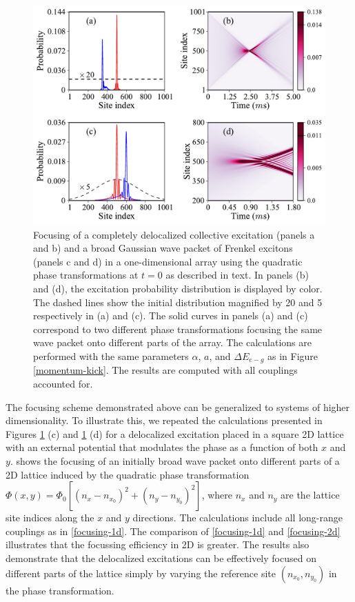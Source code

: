 \begin{figure}[htbp]
\centering
\includegraphics[width=\linewidth]{focusing-1d.pdf}
\caption{ Focusing of a completely delocalized collective
excitation (panels a and b) and a broad Gaussian wave packet of
Frenkel excitons (panels c and d) in a one-dimensional array using the quadratic phase
transformations at $t=0$ as described in text. In panels (b) and (d),
the excitation probability distribution is displayed by color.
The dashed lines
show the initial distribution magnified by 20 and 5 respectively
in (a) and (c). The solid curves in panels (a) and (c) correspond
to two different phase transformations focusing the same wave
packet onto different parts of the array.  The calculations are
performed with the same parameters $\alpha$, $a$, and $\Delta
E_{e-g}$ as in Figure \ref{momentum-kick}. The results are computed
with all couplings accounted for. }\label{focusing-1d}
\end{figure}

The focusing scheme demonstrated above can be generalized to  systems of higher
dimensionality. To illustrate this, we repeated the calculations
presented in Figures \ref{focusing-1d} (c) and \ref{focusing-1d} (d) for
a delocalized excitation placed in a square 2D lattice with an external
potential that modulates the phase as a function of both $x$ and
$y$.  shows the focusing of an initially broad wave packet
onto different parts of a 2D lattice induced by the quadratic
phase transformation $\Phi(x,y) = \Phi_0[ (n_x - n_{x_0})^2 + (n_y- n_{y_0})^2]$, 
where $n_x$ and $n_y$ are the lattice site indices along the $x$ and $y$ directions. 
The calculations include all long-range couplings as in \autoref{focusing-1d}. The comparison of \autoref{focusing-1d} and \autoref{focusing-2d} illustrates that the 
focussing efficiency in 2D is greater. The results also demonstrate that the delocalized excitations can be effectively focused on different parts of the lattice simply by varying the reference site $(n_{x_0}, n_{y_0})$ in the phase transformation. 

